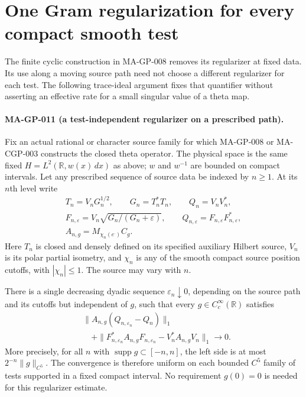 \section{One Gram regularization for every compact smooth test}
\label{sec:universal-gram-regularizer}

The finite cyclic construction in MA-GP-008 removes its
regularizer at fixed data.  Its use along a moving source path
need not choose a different regularizer for each test.
The following trace-ideal argument fixes that quantifier without
asserting an effective rate for a small singular value of a theta map.

\paragraph{MA-GP-011 (a test-independent regularizer on a prescribed path).}
Fix an actual rational or character source family for which
MA-GP-008 or MA-CGP-003 constructs the closed theta operator.
The physical space is the same fixed
$H=L^2(\mathbb R,w(x)\,dx)$ as above; $w$ and $w^{-1}$
are bounded on compact intervals.  Let any prescribed sequence
of source data be indexed by $n\ge1$.  At its $n$th level write
\[
 \begin{gathered}
 T_n=V_nG_n^{1/2},\qquad G_n=T_n^*T_n,\qquad Q_n=V_nV_n^*,\\
 F_{n,\varepsilon}=V_n\sqrt{G_n/(G_n+\varepsilon)},
 \qquad Q_{n,\varepsilon}=F_{n,\varepsilon}F_{n,\varepsilon}^*,\\
 A_{n,g}=M_{\chi_n(e^\cdot)}C_g.
 \end{gathered}
 \tag{MA-GP.150}
\]
Here $T_n$ is closed and densely defined on its specified
auxiliary Hilbert source, $V_n$ is its polar partial isometry,
and $\chi_n$ is any of the smooth compact source position
cutoffs, with $|\chi_n|\le1$.  The source may vary with $n$.

There is a single decreasing dyadic sequence
$\varepsilon_n\downarrow0$, depending on the source path
and its cutoffs but independent of $g$, such that every
$g\in C_c^\infty(\mathbb R)$ satisfies
\[
 \begin{split}
 &\|A_{n,g}(Q_{n,\varepsilon_n}-Q_n)\|_1\\
 &\quad+
 \|F_{n,\varepsilon_n}^*A_{n,g}F_{n,\varepsilon_n}
                             -V_n^*A_{n,g}V_n\|_1
                    \longrightarrow0.
 \end{split}
 \tag{MA-GP.151}
\]
More precisely, for all $n$ with
$\operatorname{supp}g\subset[-n,n]$, the left side is at most
$2^{-n}\|g\|_{C^5}$.
The convergence is therefore uniform on each bounded
$C^5$ family of tests supported in a fixed compact interval.
No requirement $g(0)=0$ is needed for this regularizer estimate.

